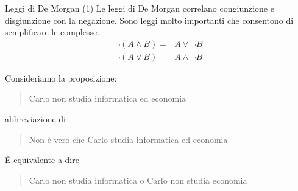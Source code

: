 \documentclass[10pt,dvipsnames,handout]{beamer}
\begin{document}
\begin{frame}{Leggi di De Morgan (1)}
    Le leggi di De Morgan correlano congiunzione e disgiunzione con la negazione. Sono leggi molto importanti che consentono di semplificare le \fp complesse.
    \begin{gather*}
        \neg (A \wedge B) = \neg A \vee \neg B\\
        \neg (A \vee B) = \neg A \wedge \neg B
    \end{gather*}

    \begin{example}
        Consideriamo la proposizione:
        \begin{quote}
            Carlo non studia informatica ed economia
        \end{quote}
        abbreviazione di
        \begin{quote}
            Non è vero che Carlo studia informatica ed economia
        \end{quote}
        È equivalente a dire
        \begin{quote}
            Carlo non studia informatica o Carlo non studia economia
        \end{quote}
    \end{example}
\end{frame}





\end{document}
